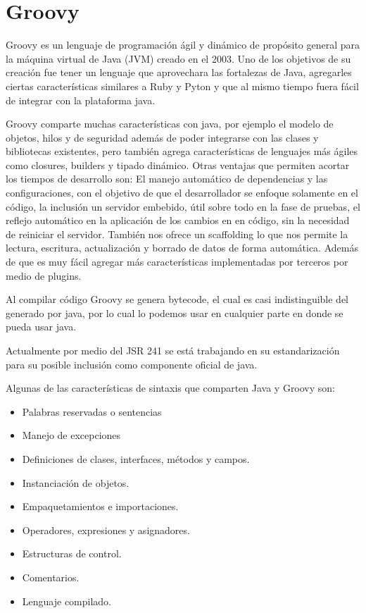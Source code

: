 \documentclass[12pt,a4paper,spanish,openany]{book}
\begin{document}
\section{Groovy}
Groovy es un lenguaje de programación ágil y dinámico
de propósito general para la máquina virtual de Java (JVM) creado en el
2003. Uno de los objetivos de su creación fue tener un lenguaje que aprovechara
las fortalezas de Java, agregarles ciertas características similares a Ruby y
Pyton y que al mismo tiempo fuera fácil de integrar con la plataforma java.

Groovy comparte muchas características con java, por ejemplo el modelo de
objetos, hilos y de seguridad además de poder integrarse con las clases y
bibliotecas existentes, pero también agrega características de lenguajes
más ágiles como closures, builders y tipado dinámico.
Otras ventajas que permiten acortar los tiempos de desarrollo son:
El manejo automático de dependencias y las configuraciones, con el
objetivo de que el desarrollador se enfoque solamente en el código,
la inclusión un servidor embebido, útil sobre todo en la fase de pruebas, el
reflejo automático en la aplicación de los cambios en en código, sin la
necesidad de reiniciar el servidor. También nos ofrece un scaffolding lo que nos
permite la lectura, escritura, actualización y borrado de datos de forma automática.
Además de que es muy fácil agregar más características implementadas por
terceros por medio de plugins.

Al compilar código Groovy se genera bytecode, el cual es casi indistinguible del
generado por java, por lo cual lo podemos usar en cualquier parte en donde se
pueda usar java.



Actualmente por medio del JSR 241 \cite{jsr241} se está trabajando en su
estandarización para su posible inclusión como componente oficial de java.

Algunas de las características de sintaxis que comparten Java y Groovy son:
\begin{itemize}
  \item Palabras reservadas o sentencias
  \item Manejo de excepciones
  \item Definiciones de clases, interfaces, métodos y campos.
  \item Instanciación de objetos.
  \item Empaquetamientos e importaciones.
  \item Operadores, expresiones y asignadores.
  \item Estructuras de control.
  \item Comentarios.
  \item Lenguaje compilado.
\end{itemize}
\end{document}
